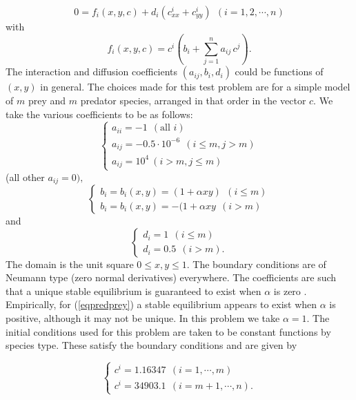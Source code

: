\documentclass[11pt]{article}
\begin{document}
\begin{equation}
0 = f_i(x,y,c) + d_i
( c^i_{xx} + c^i_{yy} ) ~ ~ (i = 1,2,\cdots,n)
\label{eqpredprey}
\end{equation}
with
\begin{equation}
f_i(x,y,c) = c^i (b_i + \sum_{j = 1}^n a_{ij} \, c^j).
\label{eqppinteract}
\end{equation}
The interaction and diffusion coefficients $(a_{ij},b_i,d_i)$
could be functions of $(x,y)$ in general. The choices made for
this test problem are for a simple model of $m$ prey and $m$
predator species, arranged in that order in the vector $c$.  We
take the various coefficients to be as follows:
\begin{equation}
\left\{
\begin{array}{l}
a_{ii} = -1 ~ ~ (\mbox{all } i) \\
a_{ij} = -0.5 \cdot 10^{-6} ~ ~ ( i \leq m , j > m )
\\
a_{ij} = 10^4 ~ ( i > m , j \leq m )
\end{array}  \right.
\end{equation}
(all other $a_{ij} = 0 ) ,$
\begin{equation}
\left\{
\begin{array}{l}
b_i = b_i(x,y) = (1 + \alpha xy )  ~ ~ ( i \leq m ) \\
b_i = b_i(x,y) = -(1 + \alpha xy   ~ ~ ( i > m )
\end{array}  \right.
\end{equation}
and
\begin{equation}
\left\{
\begin{array}{l}
d_i =   1 ~ ~ ( i \leq m ) \\
d_i = 0.5 ~ ~ ( i > m ) .
\end{array}  \right.
\end{equation}
The domain is the unit square $0 \leq x,y \leq 1$.  The boundary
conditions are of Neumann type (zero normal derivatives) everywhere.
The coefficients are such that a unique stable equilibrium is
guaranteed to exist when $\alpha$ is zero \cite{Br86}.  Empirically,
for (\ref{eqpredprey}) a stable equilibrium appears to exist when
$\alpha$ is positive, although it may not be unique. In this problem we
take $\alpha = 1$. The initial conditions used for this problem are
taken to be constant functions by species type. These satisfy the
boundary conditions and are given by

\begin{equation}
\left\{
\begin{array}{l}
c^i = 1.16347 ~~ (i=1, \cdots, m)\\
c^i = 34903.1 ~~ (i=m+1, \cdots, n).
\end{array}
\right.
\end{equation}
\end{document}
